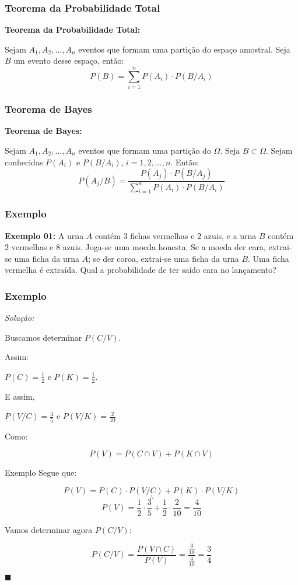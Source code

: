 \documentclass[hyperref={pdfpagelabels=false}]{beamer}
\begin{document}
\begin{frame}
\frametitle{Teorema da Probabilidade Total}
{\bf Teorema da Probabilidade Total:}

	Sejam $A_1, A_2, \dots, A_n$ eventos que formam uma partição do espaço amostral. Seja $B$ um evento desse espaço, então:
	$$P(B) = \sum_{i=1}^{n}P(A_i)\cdot P(B/A_i)$$
	

\end{frame}

\begin{frame}
	\frametitle{Teorema de Bayes}

{\bf Teorema de Bayes:}

Sejam $A_1,A_2,\dots,A_n$ eventos que formam uma partição do $\Omega$. Seja $B \subset \Omega$. Sejam conhecidas $P(A_i)$ e $P(B/A_i)$, $i = 1,2,\dots,n$. Então:
$$P(A_j/B) = \frac{P(A_j)\cdot P(B/A_j)}{\displaystyle \sum_{i=1}^{n}P(A_i)\cdot P(B/A_i)}$$

\end{frame}

\begin{frame}
	\frametitle{Exemplo}

{\bf Exemplo 01:} A urna $A$ contém $3$ fichas vermelhas e $2$ azuis, e a urna $B$ contém $2$ vermelhas e $8$ azuis. Joga-se uma moeda honesta. Se a moeda der cara, extrai-se uma ficha da urna $A$; se der coroa, extrai-se uma ficha da urna $B$. Uma ficha vermelha é extraída. Qual a probabilidade de ter saído cara no lançamento?
\end{frame}

\begin{frame}
	\frametitle{Exemplo}
	
{\it Solução:}

Buscamos determinar $P(C/V)$.

Assim:

$P(C) = \displaystyle \frac{1}{2}$ e $P(K) = \displaystyle \frac{1}{2}$.

\pause
E assim,

$P(V/C) = \displaystyle \frac{3}{5}$ e $P(V/K) = \displaystyle \frac{2}{10}$

\pause
Como:

$$P(V) = P(C \cap V) + P(K \cap V)$$

\end{frame}


\begin{frame}{Exemplo}
	Segue que:
	
	$$P(V) = P(C) \cdot P(V/C) + P(K) \cdot P(V/K)$$
	$$\therefore$$
	$$P(V) = \displaystyle \frac{1}{2}\cdot \displaystyle \frac{3}{5} + \displaystyle \frac{1}{2} \cdot \displaystyle \frac{2}{10} = \displaystyle \frac{4}{10}$$
	\pause
	
	
	Vamos determinar agora $P(C/V)$: \pause
	
	$$P(C/V) = \frac{P(V \cap C)}{P(V)} = \frac{\frac{3}{10}}{\frac{4}{10}} = \frac{3}{4}$$
	
	\begin{flushright}
		$\blacksquare$
	\end{flushright}
	
\end{frame}
\end{document}
